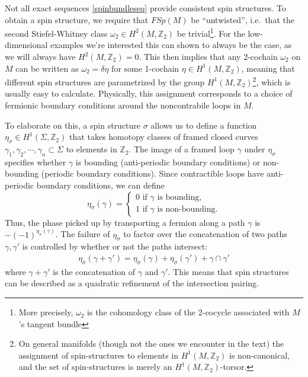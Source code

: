 \documentclass[12pt,a4paper]{article}
\newcommand{\zt}{\mathbb{Z}_2}
\newcommand\be            {\begin{equation}}
\newcommand\ee            {\end{equation}}
\begin{document}
Not all exact sequences \eqref{spinbundleseq} provide consistent spin structures. To obtain a spin structure, we require that $FSp(M)$ be ``untwisted'', i.e.\ 
that the second Stiefel-Whitney class $\omega_2 \in H^2(M,\zt)$ be trivial\footnote{More precisely, $\omega_2$ is the cohomology class of the 2-cocycle associated with $M$'s tangent bundle}. For the low-dimensional examples we're interested this can shown to always be the case, as we will always have $H^2(M,\zt) = 0$. This then implies that any 2-cochain $\omega_2$ on $M$ can be written as $\omega_2 = \delta \eta$ for some 1-cochain $\eta \in H^1(M,\zt)$, meaning that different spin structures are parametrized by the group $H^1(M,\zt)$\footnote{On general manifolds (though not the ones we encounter in the text) the assignment of spin-structures to elements in $H^1(M,\zt)$ is non-canonical, and the set of spin-structures is merely an $H^1(M,\zt)$-torsor.}, which is usually easy to calculate. Physically, this assignment corresponds to a choice of fermionic boundary conditions around the noncontrabile loops in $M$. 

To elaborate on this, a spin structure $\sigma$ allows us to define a function $\eta_\sigma \in H^1(\Sigma, \mathbb{Z}_2)$ that takes homotopy classes of framed closed curves 
$\gamma_1, \gamma_2, \cdots, \gamma_n \subset \Sigma$ to elements in $\zt$.
The image of a framed loop $\gamma$ under $\eta_\sigma$ specifies whether $\gamma$ is bounding (anti-periodic boundary conditions) or non-bounding (periodic boundary conditions).
Since contractible loops have anti-periodic boundary conditions, we can define
\be \label{etadefn} \eta_\sigma(\gamma) = \begin{cases} 0 \text{\ if $\gamma$ is bounding,}\\
1 \text{\ if $\gamma$ is non-bounding.}\end{cases} \ee
Thus, the phase picked up by transporting a fermion along a path $\gamma$ is $-(-1)^{\eta_{\sigma}(\gamma)}$.
The failure of $\eta_\sigma$ to factor over the concatenation of two paths $\gamma,\gamma'$ is controlled by whether or not the paths intersect:
\begin{align}
\eta_{\sigma} (\gamma + \gamma') = \eta_{\sigma}(\gamma) + \eta_{\sigma}(\gamma') + \gamma \cap \gamma'
\end{align}
where $\gamma+\gamma'$ is the concatenation of $\gamma$ and $\gamma'$. 
This means that spin structures can be described as a quadratic refinement of the intersection pairing. 
\end{document}
